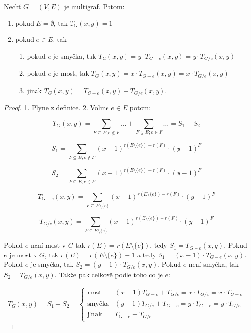\begin{veta}
	Nechť $G = (V,E)$ je multigraf. Potom:
	
	\begin{enumerate}
		\item pokud $E = \emptyset$, tak $T_{G}(x,y) = 1$
		\item pokud $e \in E$, tak
		\begin{enumerate}
			\item pokud $e$ je smyčka, tak $T_{G}(x,y) = y \cdot T_{G-e}(x,y) = y \cdot T_{G/e}(x,y)$
			\item pokud $e$ je most, tak $T_{G}(x,y) = x \cdot T_{G-e}(x,y) = x \cdot T_{G /e}(x,y)$
			\item jinak $T_{G}(x,y) = T_{G-e}(x,y) + T_{G/e}(x,y)$.
		\end{enumerate}
	\end{enumerate}
\end{veta}

\begin{proof}
	1. Plyne z definice. 2. Volme $e \in E$ potom:
	
	$$
	T_{G}(x,y) = \sum_{F \subseteq E; e \notin F} \dots + \sum_{F \subseteq E; e \in F} \dots = S_{1} + S_{2}
	$$
	
	$$
	S_{1} = \sum_{F \subseteq E; e \notin F}(x-1)^{r(E \setminus \{e\}) - r(F)} \cdot (y-1)^{F}
	$$
	
	$$
	S_{2} = \sum_{F \subseteq E; e \in F}(x-1)^{r(E \setminus \{e\}) - r(F)} \cdot (y-1)^{F}
	$$
	
	$$
	T_{G-e}(x,y) = \sum_{F \subseteq E \setminus \{e\}}(x-1)^{r(E \setminus \{e\}) - r(F)} \cdot (y-1)^{F}
	$$
	
	$$
	T_{G/e}(x,y) = \sum_{F \subseteq E \setminus \{e\}}(x-1)^{r(E \setminus \{e\}) - r(F)} \cdot (y-1)^{F}
	$$
	
	Pokud $e$ není most v $G$ tak $r(E) = r(E \setminus \{e\})$, tedy $S_{1} = T_{G-e}(x,y)$. Pokud $e$ je most v $G$, tak $r(E) = r(E \setminus \{e\}) + 1$ a tedy $S_{1} = (x-1) \cdot T_{G-e}(x,y)$. Pokud $e$ je smyčka, tak $S_{2} = (y-1) \cdot T_{G/e}(x,y)$. Pokud $e$ není smyčka, tak $S_{2} = T_{G/e}(x,y)$. Takže pak celkově podle toho co je $e$:
	
	$$
	T_{G}(x,y) = S_{1} + S_{2} =
	\left\{
	\begin{array}{ll}
		\text{most} & (x-1)T_{G-e} + T_{G/e} = x \cdot T_{G/e} = x \cdot T_{G-e} \\
		\text{smyčka} & (y-1)T_{G/e} + T_{G-e} = y \cdot T_{G-e} = y \cdot T_{G/e} \\
		\text{jinak} & T_{G-e} + T_{G/e}
	\end{array}
	\right.
	$$
\end{proof}

